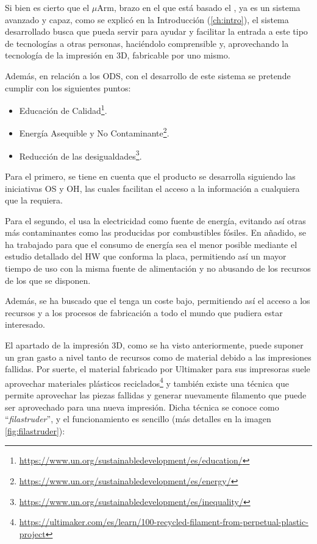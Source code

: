 Si bien es cierto que el $\mu$Arm, brazo en el que está basado el \pArm{}, 
ya es un sistema avanzado y capaz, como se explicó en la Introducción (\ref{ch:intro}),
el sistema desarrollado busca que pueda servir para ayudar y facilitar la entrada a
este tipo de tecnologías a otras personas, haciéndolo comprensible y, aprovechando
la tecnología de la impresión en 3D, fabricable por uno mismo.

Además, en relación a los \ac{ODS}, con el desarrollo de este sistema se pretende 
cumplir con los siguientes puntos:

\begin{itemize}
    \item [4 -] Educación de Calidad\footnote{\url{https://www.un.org/sustainabledevelopment/es/education/}}.
    \item [7 -] Energía Asequible y No Contaminante\footnote{\url{https://www.un.org/sustainabledevelopment/es/energy/}}.
    \item [10 -] Reducción de las desigualdades\footnote{\url{https://www.un.org/sustainabledevelopment/es/inequality/}}.
\end{itemize}

Para el primero, se tiene en cuenta que el producto se desarrolla siguiendo las 
iniciativas \ac{OS} y \ac{OH}, las cuales facilitan el acceso a la información a 
cualquiera que la requiera. %

Para el segundo, el \pArm{} usa la electricidad como fuente de energía, evitando
así otras más contaminantes como las producidas por combustibles fósiles. En añadido, 
se ha trabajado para que el consumo de energía sea el menor posible mediante el
estudio detallado del \ac{HW} que conforma la placa, permitiendo así un 
mayor tiempo de uso con la misma fuente de alimentación y no abusando de los recursos 
de los que se disponen.

Además, se ha buscado que el \pArm{} tenga un coste bajo, permitiendo así el 
acceso a los recursos y a los procesos de fabricación a todo el mundo que pudiera 
estar interesado. %

El apartado de la impresión 3D, como se ha visto anteriormente, puede suponer un
gran gasto a nivel tanto de recursos como de material debido a las impresiones
fallidas. Por suerte, el material fabricado por Ultimaker para sus impresoras
suele aprovechar materiales plásticos reciclados\footnote{\url{https://ultimaker.com/es/learn/100-recycled-filament-from-perpetual-plastic-project}}
y también existe una técnica que permite aprovechar las piezas fallidas y
generar nuevamente filamento que puede ser aprovechado para una nueva impresión.
Dicha técnica se conoce como ``\textit{filastruder}'', y el funcionamiento es
sencillo (más detalles en la imagen \ref{fig:filastruder}):

